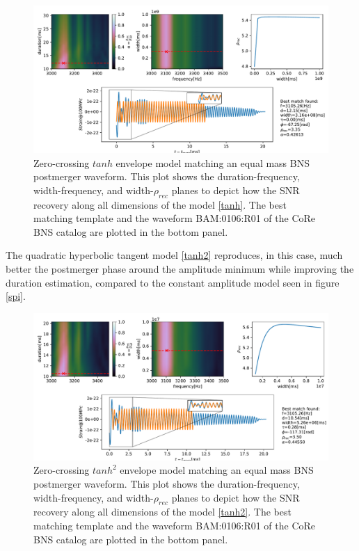 \begin{figure}[hbt!]
\begin{center}
\includegraphics[width=\textwidth, angle=0]{images/Data_analysis/results/envel_110_tanh.pdf}
\captionsetup{width=0.8\textwidth}
\caption[Zero-crossing $tanh$ envelope model matching a spinning BNS postmerger waveform]{Zero-crossing $tanh$ envelope model matching an equal mass BNS postmerger waveform. This plot shows the duration-frequency, width-frequency, and width-$\rho_{rec}$ planes to depict how the SNR recovery along all dimensions of the model \ref{tanh}. The best matching template and the waveform BAM:0106:R01 of the CoRe BNS catalog \cite{Dietrich:2018phi} are plotted in the bottom panel.}
\end{center}
\end{figure}

\FloatBarrier
\newpage
The quadratic hyperbolic tangent model \ref{tanh2} reproduces, in this case, much better the postmerger phase around the amplitude minimum while improving the duration estimation, compared to the constant amplitude model seen in figure \ref{spi}.

\begin{figure}[hbt!]
\begin{center}
\includegraphics[width=\textwidth, angle=0]{images/Data_analysis/results/envel_110_tanh2.pdf}
\captionsetup{width=0.8\textwidth}
\caption[Zero-crossing $tanh^2$ envelope model matching a spinning BNS postmerger waveform]{Zero-crossing $tanh^2$ envelope model matching an equal mass BNS postmerger waveform. This plot shows the duration-frequency, width-frequency, and width-$\rho_{rec}$ planes to depict how the SNR recovery along all dimensions of the model \ref{tanh2}. The best matching template and the waveform BAM:0106:R01 of the CoRe BNS catalog \cite{Dietrich:2018phi} are plotted in the bottom panel.}
\end{center}
\end{figure}

